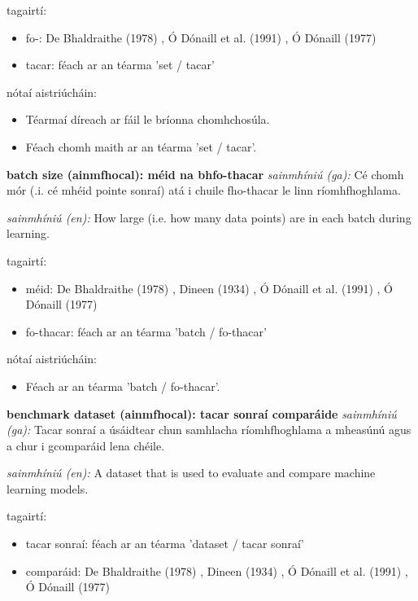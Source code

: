 \documentclass{article}
\begin{document}
tagairtí:
\begin{itemize}
	\item fo-: De Bhaldraithe (1978) \cite{de-bhaldraithe}, Ó Dónaill et al. (1991) \cite{focloir-beag}, Ó Dónaill (1977) \cite{odonaill}
	\item tacar: féach ar an téarma 'set / tacar'
\end{itemize}

nótaí aistriúcháin:
\begin{itemize}
	\item Téarmaí díreach ar fáil le bríonna chomhchosúla.
	\item Féach chomh maith ar an téarma 'set / tacar'.
\end{itemize}


\textbf{batch size (ainmfhocal): méid na bhfo-thacar}
\textit{sainmhíniú (ga):} Cé chomh mór (.i. cé mhéid pointe sonraí) atá i chuile fho-thacar le linn ríomhfhoghlama.

\textit{sainmhíniú (en):} How large (i.e. how many data points) are in each batch during learning.

tagairtí:
\begin{itemize}
	\item méid: De Bhaldraithe (1978) \cite{de-bhaldraithe}, Dineen (1934) \cite{dineen}, Ó Dónaill et al. (1991) \cite{focloir-beag}, Ó Dónaill (1977) \cite{odonaill}
	\item fo-thacar: féach ar an téarma 'batch / fo-thacar'
\end{itemize}

nótaí aistriúcháin:
\begin{itemize}
	\item Féach ar an téarma 'batch / fo-thacar'.
\end{itemize}


\textbf{benchmark dataset (ainmfhocal): tacar sonraí comparáide}
\textit{sainmhíniú (ga):} Tacar sonraí a úsáidtear chun samhlacha ríomhfhoghlama a mheasúnú agus a chur i gcomparáid lena chéile.

\textit{sainmhíniú (en):} A dataset that is used to evaluate and compare machine learning models.

tagairtí:
\begin{itemize}
	\item tacar sonraí: féach ar an téarma 'dataset / tacar sonraí'
	\item comparáid: De Bhaldraithe (1978) \cite{de-bhaldraithe}, Dineen (1934) \cite{dineen}, Ó Dónaill et al. (1991) \cite{focloir-beag}, Ó Dónaill (1977) \cite{odonaill}
\end{itemize}
\end{document}
